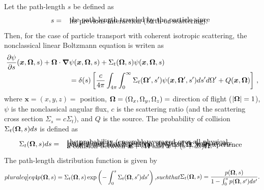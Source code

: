 \documentclass[12pt]{article}
\newcommand{\ux}{{\bm x}}
\newcommand{\uomega}{{\bf \Omega}}
\begin{document}
Let the path-length $s$ be defined as
\begin{align}\label{eq1}
s =  \begin{array}{l}
\text{ the path-length traveled by the particle since}\vspace{-10pt}\\
\text{ its previous interaction (birth or scattering).}\\
\end{array}
\end{align}
Then, for the case of particle transport with coherent isotropic scattering, the nonclassical linear Boltzmann equation is writen as \citep{vaslar14a}
\begin{align}\label{eq2}
\frac{\partial\psi}{\partial s}(\ux,\uomega,s) + \uomega\cdot\bm\nabla & \psi(\ux,\uomega,s) + \Sigma_t(\uomega,s)\psi(\ux,\uomega,s) 
\\&= \delta(s)\left[ \frac{c}{4\pi}\int_{4\pi}\int_0^\infty \Sigma_t(\uomega',s')\psi(\ux,\uomega',s')ds' d\Omega' + Q(\ux,\uomega) \right]\,, \nonumber
\end{align}
where $\ux = (x,y,z)=$ position, $\uomega = (\Omega_x,\Omega_y,\Omega_z)=$ direction of flight ($|\uomega|=1$), $\psi$ is the nonclassical angular flux, $c$ is the scattering ratio (and the scattering cross section $\Sigma_s= c\Sigma_t$), and $Q$ is the source.
The probability of collision $\Sigma_t(\uomega,s)ds$ is defined as
\begin{align}\label{eq3}
\Sigma_t(\uomega,s)ds =  \begin{array}{l}
\text{ the probability (ensemble-averaged over all physical}\vspace{-10pt}\\
\text{ realizations) that a particle, scattered or born at any}\vspace{-10pt}\\
\text{ point $\ux$ and traveling in the direction $\uomega$, will experience}\vspace{-10pt}\\
\text{ a collision between $\ux + s\uomega$ and $\ux + (s+ds)\uomega$.}
\end{array}
\end{align}
The path-length distribution function is given by
\begin{subequations}\label[pluraleq]{eq4}
\begin{align}\label{eq4a}
p(\uomega,s) = \Sigma_t(\uomega,s)\exp\left( -\int_0^s\Sigma_t(\uomega,s')ds'\right),
\end{align}
such that
\begin{align}\label{eq4b}
\Sigma_t(\uomega,s)=\frac{p(\uomega,s)}{1-\int_0^sp(\uomega,s')ds'}.
\end{align}
\end{subequations}
\end{document}
